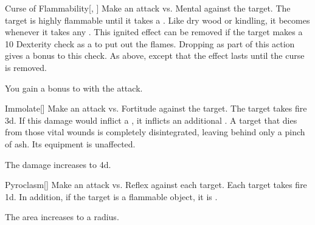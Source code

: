 \lowercase{\hypertarget{spell:Curse of Flammability}{}}\label{spell:Curse of Flammability}
\begin{freeability}[Rank 5]{\hypertarget{spell:Curse of Flammability}{Curse of Flammability}}[, ]
Make an attack vs. Mental against the target.
\hit The target is highly flammable until it takes a .
Like dry wood or kindling, it becomes  whenever it takes any .
This ignited effect can be removed if the target makes a  10 Dexterity check as a  to put out the flames.
Dropping  as part of this action gives a  bonus to this check.
\crit As above, except that the effect lasts until the curse is removed.

\rankline
{} You gain a  bonus to  with the attack.

\end{freeability}
\vspace{0.25em}



\lowercase{\hypertarget{spell:Immolate}{}}\label{spell:Immolate}
\begin{freeability}[Rank 5]{\hypertarget{spell:Immolate}{Immolate}}[]
Make an attack vs. Fortitude against the target.
\hit The target takes fire  \plus3d.
If this damage would inflict a , it inflicts an additional .
A target that dies from those vital wounds is completely disintegrated, leaving behind only a pinch of ash.
Its equipment is unaffected.

\rankline
{} The damage increases to  \plus4d.

\end{freeability}
\vspace{0.25em}



\lowercase{\hypertarget{spell:Pyroclasm}{}}\label{spell:Pyroclasm}
\begin{freeability}[Rank 5]{\hypertarget{spell:Pyroclasm}{Pyroclasm}}[]
Make an attack vs. Reflex against each target.
\hit Each target takes fire  \minus1d.
In addition, if the target is a flammable object, it is .

\rankline
{} The area increases to a \arealarge radius.

\end{freeability}
\vspace{0.25em}




